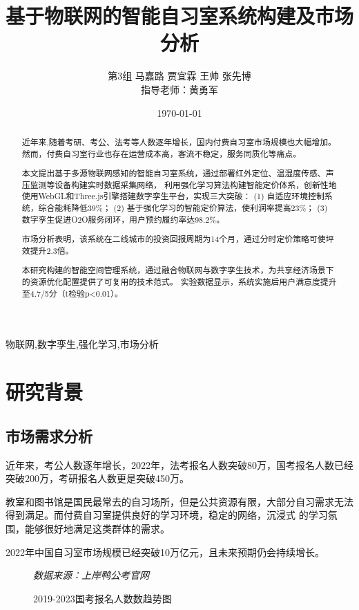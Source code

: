 \documentclass[12pt,a4paper]{IEEEtran} %
\title{基于物联网的智能自习室系统构建及市场分析}
\author{第3组 \quad  马嘉路 \quad 贾宜霖 \quad 王帅 \quad  张先博  \\ 指导老师：黄勇军}
\date{\today}
\begin{document}
\maketitle

\begin{abstract}
  近年来,随着考研、考公、法考等人数逐年增长，国内付费自习室市场规模也大幅增加。
  然而，付费自习室行业也存在运营成本高，客流不稳定，服务同质化等痛点。

  本文提出基于多源物联网感知的智能自习室系统，通过部署红外定位、温湿度传感、声压监测等设备构建实时数据采集网络，
  利用强化学习算法构建智能定价体系，创新性地使用WebGL和Three.js引擎搭建数字孪生平台，实现三大突破：
  (1) 自适应环境控制系统，综合能耗降低39\%；
  (2) 基于强化学习的智能定价算法，使利润率提高23\%；
  (3) 数字孪生促进O2O服务闭环，用户预约履约率达98.2\%。

  市场分析表明，该系统在二线城市的投资回报周期为14个月，通过分时定价策略可使坪效提升2.3倍。

  本研究构建的智能空间管理系统，通过融合物联网与数字孪生技术，为共享经济场景下的资源优化配置提供了可复用的技术范式。
  实验数据显示，系统实施后用户满意度提升至4.7/5分（t检验p<0.01）。
\end{abstract}

\begin{IEEEkeywords}
  物联网,数字孪生,强化学习,市场分析
\end{IEEEkeywords}

\section{研究背景}
\subsection{市场需求分析}

近年来，考公人数逐年增长，2022年，法考报名人数突破80万，国考报名人数已经突破200万，考研报名人数更是突破450万\cite{duck}。

教室和图书馆是国民最常去的自习场所，但是公共资源有限，大部分自习需求无法得到满足。而付费自习室提供良好的学习环境，稳定的网络，沉浸式
的学习氛围，能够很好地满足这类群体的需求。

2022年中国自习室市场规模已经突破10万亿元\cite{aimei}，且未来预期仍会持续增长。
\begin{figure}[htbp]
  \centering
  \caption{2019-2023国考报名人数数趋势图}
  \small\textit{数据来源：上岸鸭公考官网}
\end{figure}
\end{document}
